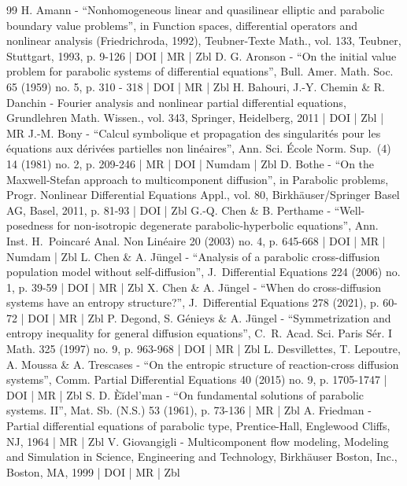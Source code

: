 \begin{thebibliography}{99}
H. Amann - “Nonhomogeneous linear and quasilinear elliptic and parabolic boundary value problems”, in Function spaces, differential operators and nonlinear analysis (Friedrichroda, 1992), Teubner-Texte Math., vol. 133, Teubner, Stuttgart, 1993, p. 9-126 | DOI | MR | Zbl
D. G. Aronson - “On the initial value problem for parabolic systems of differential equations”, Bull. Amer. Math. Soc. 65 (1959) no. 5, p. 310 - 318 | DOI | MR | Zbl
H. Bahouri, J.-Y. Chemin \& R. Danchin - Fourier analysis and nonlinear partial differential equations, Grundlehren Math. Wissen., vol. 343, Springer, Heidelberg, 2011 | DOI | Zbl | MR
J.-M. Bony - “Calcul symbolique et propagation des singularités pour les équations aux dérivées partielles non linéaires”, Ann. Sci. École Norm. Sup. (4) 14 (1981) no. 2, p. 209-246 | MR | DOI | Numdam | Zbl
D. Bothe - “On the Maxwell-Stefan approach to multicomponent diffusion”, in Parabolic problems, Progr. Nonlinear Differential Equations Appl., vol. 80, Birkhäuser/Springer Basel AG, Basel, 2011, p. 81-93 | DOI | Zbl
G.-Q. Chen \& B. Perthame - “Well-posedness for non-isotropic degenerate parabolic-hyperbolic equations”, Ann. Inst. H. Poincaré Anal. Non Linéaire 20 (2003) no. 4, p. 645-668 | DOI | MR | Numdam | Zbl
L. Chen \& A. Jüngel - “Analysis of a parabolic cross-diffusion population model without self-diffusion”, J. Differential Equations 224 (2006) no. 1, p. 39-59 | DOI | MR | Zbl
X. Chen \& A. Jüngel - “When do cross-diffusion systems have an entropy structure?”, J. Differential Equations 278 (2021), p. 60-72 | DOI | MR | Zbl
P. Degond, S. Génieys \& A. Jüngel - “Symmetrization and entropy inequality for general diffusion equations”, C. R. Acad. Sci. Paris Sér. I Math. 325 (1997) no. 9, p. 963-968 | DOI | MR | Zbl
L. Desvillettes, T. Lepoutre, A. Moussa \& A. Trescases - “On the entropic structure of reaction-cross diffusion systems”, Comm. Partial Differential Equations 40 (2015) no. 9, p. 1705-1747 | DOI | MR | Zbl
S. D. Èĭdel’man - “On fundamental solutions of parabolic systems. II”, Mat. Sb. (N.S.) 53 (1961), p. 73-136 | MR | Zbl
A. Friedman - Partial differential equations of parabolic type, Prentice-Hall, Englewood Cliffs, NJ, 1964 | MR | Zbl
V. Giovangigli - Multicomponent flow modeling, Modeling and Simulation in Science, Engineering and Technology, Birkhäuser Boston, Inc., Boston, MA, 1999 | DOI | MR | Zbl

\end{thebibliography}
